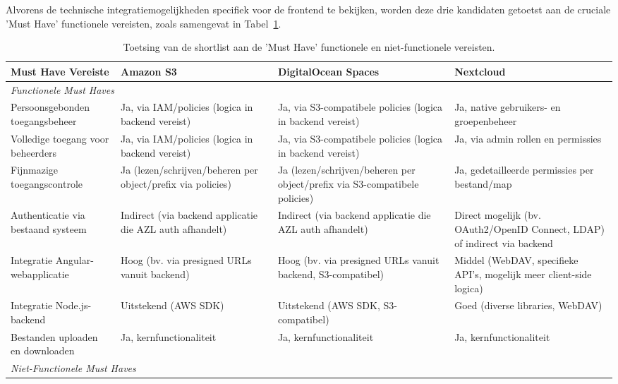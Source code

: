 Alvorens de technische integratiemogelijkheden specifiek voor de frontend te bekijken, worden deze drie kandidaten getoetst aan de cruciale 'Must Have' functionele vereisten, zoals samengevat in Tabel~\ref{tab:musthave-vergelijking}.

\begin{table}[H]
    \centering
    \footnotesize
    \caption[Toetsing shortlist aan Must Have vereisten]{\label{tab:musthave-vergelijking}Toetsing van de shortlist aan de 'Must Have' functionele en niet-functionele vereisten.}
    \begin{tabularx}{\textwidth}{lXXX}
        \toprule
        \textbf{Must Have Vereiste} & \textbf{Amazon S3} & \textbf{DigitalOcean Spaces} & \textbf{Nextcloud} \\
        \midrule
        \multicolumn{4}{l}{\textit{Functionele Must Haves}} \\
        Persoonsgebonden toegangsbeheer & Ja, via IAM/policies (logica in backend vereist) & Ja, via S3-compatibele policies (logica in backend vereist) & Ja, native gebruikers- en groepenbeheer \\
        Volledige toegang voor beheerders & Ja, via IAM/policies (logica in backend vereist) & Ja, via S3-compatibele policies (logica in backend vereist) & Ja, via admin rollen en permissies \\
        Fijnmazige toegangscontrole & Ja (lezen/schrijven/beheren per object/prefix via policies) & Ja (lezen/schrijven/beheren per object/prefix via S3-compatibele policies) & Ja, gedetailleerde permissies per bestand/map \\
        Authenticatie via bestaand systeem & Indirect (via backend applicatie die AZL auth afhandelt) & Indirect (via backend applicatie die AZL auth afhandelt) & Direct mogelijk (bv. OAuth2/OpenID Connect, LDAP) of indirect via backend \\
        Integratie Angular-webapplicatie & Hoog (bv. via presigned URLs vanuit backend) & Hoog (bv. via presigned URLs vanuit backend, S3-compatibel) & Middel (WebDAV, specifieke API's, mogelijk meer client-side logica) \\
        Integratie Node.js-backend & Uitstekend (AWS SDK) & Uitstekend (AWS SDK, S3-compatibel) & Goed (diverse libraries, WebDAV) \\
        Bestanden uploaden en downloaden & Ja, kernfunctionaliteit & Ja, kernfunctionaliteit & Ja, kernfunctionaliteit \\
        \midrule
        \multicolumn{4}{l}{\textit{Niet-Functionele Must Haves}} \\

\end{tabularx}
\end{table}
